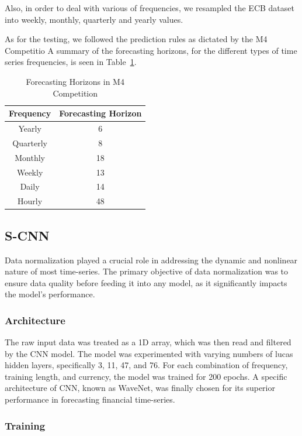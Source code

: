 \documentclass[conference]{IEEEtran}
\begin{document}
Also, in order to deal with various of frequencies, we resampled the ECB dataset into weekly, monthly, quarterly and yearly values. 

As for the testing, we followed the prediction rules as dictated by the M4 Competitio\cite{m4} A summary of the forecasting horizons, for the different types of time series frequencies, is seen in Table~\ref{tab:m4_horizons}.

\begin{table}[h]
\centering
\caption{Forecasting Horizons in M4 Competition\cite{m4}}\label{tab:m4_horizons}
\begin{tabular}{cc}
\toprule
\textbf{Frequency} & \textbf{Forecasting Horizon} \\
\midrule
Yearly & 6 \\
Quarterly & 8 \\
Monthly & 18 \\
Weekly & 13 \\
Daily & 14 \\
Hourly & 48 \\
\bottomrule
\end{tabular}
\end{table}

\subsection{S-CNN}

Data normalization played a crucial role in addressing the dynamic and nonlinear nature of most time-series. The primary objective of data normalization was to ensure data quality before feeding it into any model, as it significantly impacts the model's performance.

\subsubsection{Architecture}

The raw input data was treated as a 1D array, which was then read and filtered by the CNN model. The model was experimented with varying numbers of lucas hidden layers, specifically 3, 11, 47, and 76. For each combination of frequency, training length, and currency, the model was trained for 200 epochs. A specific architecture of CNN, known as WaveNet\cite{e-cnn}, was finally chosen for its superior performance in forecasting financial time-series.

\subsubsection{Training}
\end{document}
